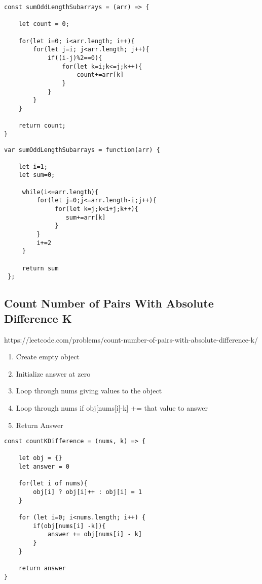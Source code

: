 \documentclass[10pt]{article}
\begin{document}
\begin{lstlisting}[title=Solution sumOddLengthSubarrays with for loops and modulo, captionpos=t]
const sumOddLengthSubarrays = (arr) => {

    let count = 0;

    for(let i=0; i<arr.length; i++){
        for(let j=i; j<arr.length; j++){
            if((i-j)%2==0){
                for(let k=i;k<=j;k++){
                    count+=arr[k]
                }
            }
        }
    }

    return count;
}
\end{lstlisting}

\begin{lstlisting}[title=Solution sumOddLengthSubarrays with while loop, captionpos=t]
var sumOddLengthSubarrays = function(arr) {

    let i=1;
    let sum=0;

     while(i<=arr.length){
         for(let j=0;j<=arr.length-i;j++){
              for(let k=j;k<i+j;k++){
                 sum+=arr[k]
              }
         }
         i+=2
     }
     
     return sum
 };
\end{lstlisting}


\medskip %


\pagebreak %
\medskip 
\subsection{Count Number of Pairs With Absolute Difference K}
https://leetcode.com/problems/count-number-of-pairs-with-absolute-difference-k/

\begin{enumerate}
	\item Create empty object
	\item Initialize answer at zero
	\item Loop through nums giving values to the object
	\item Loop through nums if obj[nums[i]-k] += that value to answer
	\item Return Answer
\end{enumerate}



\begin{lstlisting}[title=Solution countKDifference, captionpos=t]
const countKDifference = (nums, k) => {
    
    let obj = {}
    let answer = 0

    for(let i of nums){
        obj[i] ? obj[i]++ : obj[i] = 1
    }
    
    for (let i=0; i<nums.length; i++) {
        if(obj[nums[i] -k]){
            answer += obj[nums[i] - k]
        }
    }
    
    return answer 
}
\end{lstlisting}
\medskip %
\end{document}
